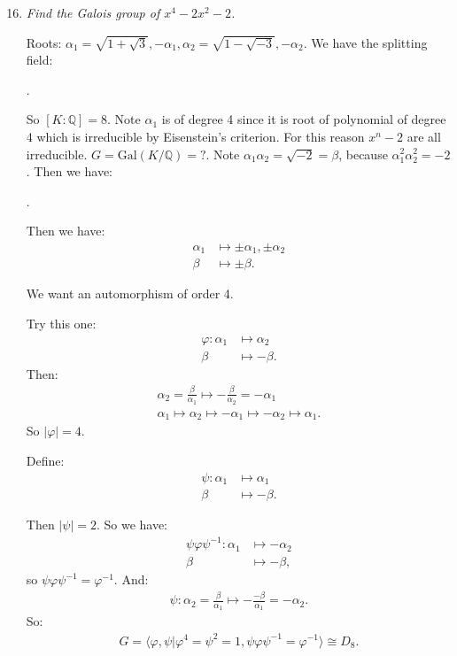 \documentclass[9pt,reqno,twoside]{amsbook}
\theoremstyle{plain}
\numberwithin{section}{chapter}
\numberwithin{equation}{chapter}
\theoremstyle{definition}
\theoremstyle{remark}
\theoremstyle{plain}
\newcommand{\Q}{\mathbb{Q}}
\newcommand{\bee}{\begin{equation}\begin{aligned}}
\newcommand{\eee}{\end{aligned}\end{equation}}
\newcommand{\fracc}{\frac}
\newcommand{\counter}{\setcounter}
\newcommand{\gal}{\mathrm{Gal}}
\renewcommand{\phi}{\varphi}
\begin{document}
\begin{enumerate}[label=\arabic*.]
\counter{enumi}{15}

\item \textit{Find the Galois group of $x^4 - 2x^2 - 2$. }

Roots: $\alpha_1 = \sqrt{1 + \sqrt{3}},-\alpha_1,\alpha_2 = \sqrt{1-  \sqrt{-3}},-\alpha_2$. We have the splitting field:
\begin{center}
.
\end{center}

So $[K:\Q] = 8$. Note $\alpha_1$ is of degree 4 since it is root of polynomial of degree 4 which is irreducible by Eisenstein's criterion. For this reason $x^n - 2$ are all irreducible. $G = \gal(K/\Q) = ?$. Note $\alpha_1\alpha_2 = \sqrt{-2} = \beta$, because $\alpha_1^2\alpha_2^2 = -2$. Then we have:
\begin{center}
.
\end{center}

Then we have:
\bee
\alpha_1 &\mapsto \pm \alpha_1,\pm \alpha_2\\
\beta &\mapsto \pm \beta.
\eee

We want an automorphism of order 4. 

Try this one:
\bee
\phi:\alpha_1 &\mapsto \alpha_2\\
\beta &\mapsto -\beta.
\eee
Then:
\bee
\alpha_2 = \fracc{\beta}{\alpha_1}\mapsto - \fracc{\beta}{\alpha_2} =-\alpha_1\\
\alpha_1 \mapsto \alpha_2 \mapsto -\alpha_1 \mapsto -\alpha_2 \mapsto \alpha_1.
\eee
So $|\phi| = 4$. 

Define:
\bee
\psi: \alpha_1 & \mapsto \alpha_1\\
\beta &\mapsto -\beta.
\eee

Then $|\psi| = 2$. So we have:
\bee
\psi\phi\psi^{-1}: \alpha_1 &\mapsto -\alpha_2\\
\beta &\mapsto -\beta,
\eee
so $\psi\phi\psi^{-1} = \phi^{-1}$. And:
\bee
\psi:\alpha_2 = \fracc{\beta}{\alpha_1} \mapsto -\fracc{-\beta}{\alpha_1} = -\alpha_2.
\eee
So:
\bee
G = \langle\phi,\psi|\phi^4 = \psi^2 = 1,\psi\phi\psi^{-1} = \phi^{-1} \rangle \cong D_8.
\eee





\end{enumerate}
\end{document}
